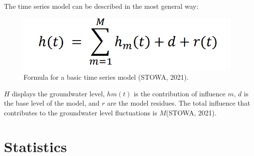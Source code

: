 The time series model can be described in the most general way: 
\begin{figure}[htbp]
    \centering
    \includegraphics[width=0.5\linewidth]{appendix/basic model.png}
    \caption{Formula for a basic time series model (STOWA, 2021).}
    \label{Pastas}
\end{figure}
\(H\) displays the groundwater level, \(hm(t)\) is the contribution of influence \(m\), \(d\) is the base level of the model, and \(r\) are the model residues. The total influence that contributes to the groundwater level fluctuations is \(M\)(STOWA, 2021). 

 
\section{Statistics}
